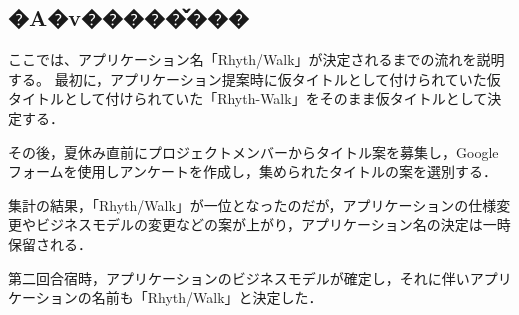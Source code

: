\subsection{�A�v�����̌���}
ここでは、アプリケーション名「Rhyth/Walk」が決定されるまでの流れを説明する。
最初に，アプリケーション提案時に仮タイトルとして付けられていた仮タイトルとして付けられていた「Rhyth-Walk」をそのまま仮タイトルとして決定する．\par
その後，夏休み直前にプロジェクトメンバーからタイトル案を募集し，Googleフォームを使用しアンケートを作成し，集められたタイトルの案を選別する．\par
集計の結果，「Rhyth/Walk」が一位となったのだが，アプリケーションの仕様変更やビジネスモデルの変更などの案が上がり，アプリケーション名の決定は一時保留される．\par
第二回合宿時，アプリケーションのビジネスモデルが確定し，それに伴いアプリケーションの名前も「Rhyth/Walk」と決定した．\par
